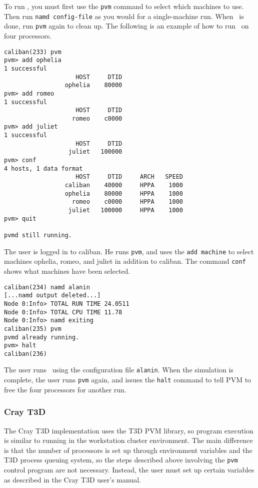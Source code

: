 To run \NAMD, you must first use the {\tt pvm} command to select which
machines to use.  Then run {\tt namd config-file} as you would for a
single-machine run.  When \NAMD\ is done, run {\tt pvm} again to clean
up.  The following is an example of how to run \NAMD\ on four
processors.
\begin{verbatim}
caliban(233) pvm
pvm> add ophelia
1 successful
                    HOST     DTID
                 ophelia    80000
pvm> add romeo
1 successful
                    HOST     DTID
                   romeo    c0000
pvm> add juliet
1 successful
                    HOST     DTID
                  juliet   100000
pvm> conf
4 hosts, 1 data format
                    HOST     DTID     ARCH   SPEED
                 caliban    40000     HPPA    1000
                 ophelia    80000     HPPA    1000
                   romeo    c0000     HPPA    1000
                  juliet   100000     HPPA    1000
pvm> quit

pvmd still running.
\end{verbatim}

The user is logged in to caliban.  He runs {\tt pvm}, and uses the
{\tt add machine} to select machines ophelia, romeo, and juliet in
addition to caliban.  The command {\tt conf} shows what machines have
been selected.

\begin{verbatim}
caliban(234) namd alanin
[...namd output deleted...]
Node 0:Info> TOTAL RUN TIME 24.0511
Node 0:Info> TOTAL CPU TIME 11.78
Node 0:Info> namd exiting
caliban(235) pvm
pvmd already running.
pvm> halt
caliban(236) 
\end{verbatim}

The user runs \NAMD\ using the configuration file {\tt alanin}.  When
the simulation is complete, the user runs {\tt pvm} again, and issues
the {\tt halt} command to tell PVM to free the four processors for
another run.

\subsubsection{Cray T3D}

The Cray T3D implementation uses the T3D PVM library, so program
execution is similar to running in the workstation cluster
environment.  The main difference is that the number of processors is
set up through environment variables and the T3D process queuing
system, so the steps described above involving the {\tt pvm} control
program are not necessary.  Instead, the user must set up certain
variables as described in the Cray T3D user's manual.

